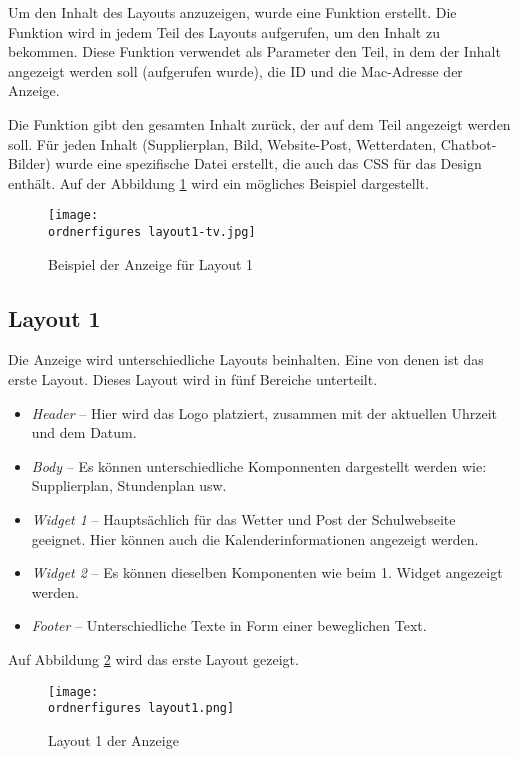 Um den Inhalt des Layouts anzuzeigen, wurde eine Funktion erstellt. Die Funktion wird in jedem Teil des Layouts aufgerufen, um den Inhalt zu bekommen. Diese Funktion verwendet als Parameter den Teil, in dem der Inhalt angezeigt werden soll (aufgerufen wurde), die ID und die Mac-Adresse der Anzeige.

Die Funktion gibt den gesamten Inhalt zurück, der auf dem Teil angezeigt werden soll. Für jeden Inhalt (Supplierplan, Bild, Website-Post, Wetterdaten, Chatbot-Bilder) wurde eine spezifische Datei erstellt, die auch das CSS für das Design enthält.
Auf der Abbildung \ref{fi:beispiel} wird ein mögliches Beispiel dargestellt.


\begin{figure}[H]
	\centering
	\texttt{[image: \\ordnerfigures layout1-tv.jpg]}
	\caption{Beispiel der Anzeige für Layout 1}
	\label{fi:beispiel}
\end{figure}


\subsection{Layout 1}
Die Anzeige wird unterschiedliche Layouts beinhalten. Eine von denen ist das erste Layout. Dieses Layout wird in fünf Bereiche unterteilt.

\begin{itemize}
	\item \textit{Header} – Hier wird das Logo platziert, zusammen mit der aktuellen Uhrzeit und dem Datum.
	\item \textit{Body} – Es können unterschiedliche Komponnenten dargestellt werden wie: Supplierplan, Stundenplan usw.
	\item \textit{Widget 1} – Hauptsächlich für das Wetter und Post der Schulwebseite geeignet. Hier können auch die Kalenderinformationen angezeigt werden.
	\item \textit{Widget 2} – Es können dieselben Komponenten wie beim 1. Widget angezeigt werden.
	\item \textit{Footer} – Unterschiedliche Texte in Form einer beweglichen Text.
	
\end{itemize}

Auf Abbildung \ref{fi:layout1} wird das erste Layout gezeigt.

\begin{figure}[H]
	\centering
	\texttt{[image: \\ordnerfigures layout1.png]}
	\caption{Layout 1 der Anzeige}
	\label{fi:layout1}
\end{figure}

